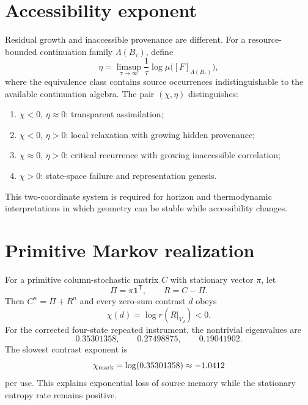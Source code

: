 \documentclass[11pt,a4paper]{article}
\begin{document}
\section{Accessibility exponent}
Residual growth and inaccessible provenance are different. For a resource-bounded continuation family $\Lambda(B_\tau)$, define
\begin{equation}
\eta=\limsup_{\tau\to\infty}\frac1\tau
\log\mu\bigl([F]_{\Lambda(B_\tau)}\bigr),
\end{equation}
where the equivalence class contains source occurrences indistinguishable to the available continuation algebra. The pair $(\chi,\eta)$ distinguishes:
\begin{enumerate}
\item $\chi<0$, $\eta\approx0$: transparent assimilation;
\item $\chi<0$, $\eta>0$: local relaxation with growing hidden provenance;
\item $\chi\approx0$, $\eta>0$: critical recurrence with growing inaccessible correlation;
\item $\chi>0$: state-space failure and representation genesis.
\end{enumerate}
This two-coordinate system is required for horizon and thermodynamic interpretations in which geometry can be stable while accessibility changes.

\section{Primitive Markov realization}
For a primitive column-stochastic matrix $C$ with stationary vector $\pi$, let
\begin{equation}
\Pi=\pi\mathbf1^{\mathsf T},\qquad R=C-\Pi.
\end{equation}
Then $C^n=\Pi+R^n$ and every zero-sum contrast $d$ obeys
\begin{equation}
\chi(d)=\log r(R|_{V_d})<0.
\end{equation}
For the corrected four-state repeated instrument, the nontrivial eigenvalues are
\begin{equation}
0.35301358,\qquad0.27498875,\qquad0.19041902.
\end{equation}
The slowest contrast exponent is
\begin{equation}
\chi_{\rm mark}=\log(0.35301358)\approx-1.0412
\end{equation}
per use. This explains exponential loss of source memory while the stationary entropy rate remains positive.
\end{document}
